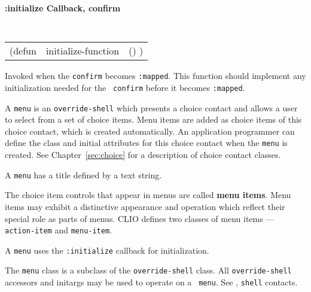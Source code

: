 {\samepage
{\large {\bf :initialize \hfill Callback, confirm}} 
\begin{flushright} 
\parbox[t]{6.125in}{
\tt
\begin{tabular}{lll}
\raggedright
(defun & initialize-function & () )
\end{tabular}
\rm

}\end{flushright}}

\begin{flushright} \parbox[t]{6.125in}{
Invoked when the {\tt confirm} becomes {\tt :mapped}.
This function should implement any initialization needed for the {\tt
confirm} before it becomes {\tt :mapped}.
}\end{flushright}

\vfill
\pagebreak


A {\tt menu} is an {\tt override-shell} which presents a choice
contact and allows a user to select from a set of choice items.
Menu items are added as choice items of this choice contact, which is created
automatically.  An application programmer can define the class and initial
attributes for this choice contact when the {\tt menu} is created.  See
Chapter~\ref{sec:choice} for a description of choice contact classes.

A {\tt menu} has a title defined by a text string. 

The choice item controls that appear in menus are called {\bf menu
items}. Menu items may exhibit a distinctive appearance and
operation which reflect their special role as parts of menus. CLIO defines two
classes of menu items  --- {\tt action-item} and {\tt menu-item}.

A {\tt menu} uses the {\tt :initialize} callback for initialization.



The {\tt menu} class is a subclass of the {\tt override-shell} class. All
{\tt override-shell} accessors and initargs may be used to operate on a {\tt
menu}. See \cite{clue}, {\tt shell} contacts.

